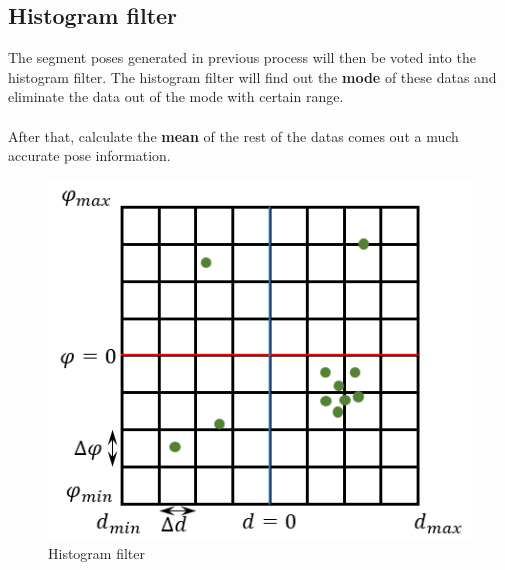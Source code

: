 \documentclass{article}
\begin{document}
\subsection{Histogram filter}

The segment poses generated in previous process will then be voted into the histogram filter. The histogram filter will find out the \textbf{mode} of these datas and eliminate the data out of the mode with certain range.
\\
\\
\noindent After that, calculate the \textbf{mean} of the rest of the datas comes out a much accurate pose information. 

\begin{figure}[ht]
  \label{fig:histogram_filter}
  \centering
  \includegraphics[scale=0.9]{graphs/histogram_filter.PNG}
  \caption{Histogram filter}
\end{figure}
\FloatBarrier
\end{document}
